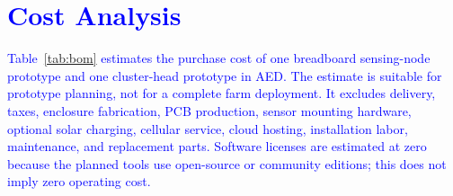 \documentclass[12pt,a4paper,oneside]{memoir}
\newcommand{\earlierrevision}[1]{\textcolor{blue}{#1}}
\begin{document}
\clearpage

\section{\earlierrevision{Cost Analysis}}
\label{sec:Budget}

\earlierrevision{Table~\ref{tab:bom} estimates the purchase cost of one breadboard sensing-node prototype and one cluster-head prototype in AED. The estimate is suitable for prototype planning, not for a complete farm deployment. It excludes delivery, taxes, enclosure fabrication, PCB production, sensor mounting hardware, optional solar charging, cellular service, cloud hosting, installation labor, maintenance, and replacement parts. Software licenses are estimated at zero because the planned tools use open-source or community editions; this does not imply zero operating cost.}
\end{document}
